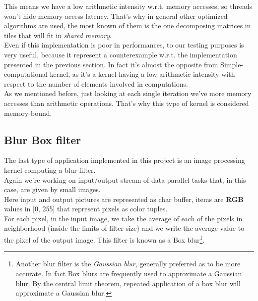 	This means we have a low arithmetic intensity w.r.t. memory accesses, so threads won't hide memory access latency.
	That's why in general other optimized algorithms are used, the most known of them is the one decomposing matrices in tiles that will fit in \textit{shared memory}.\\
	Even if this implementation is poor in performances, to our testing purposes is very useful, because it represent a counterexample w.r.t. the implementation presented in the previous section.
	In fact it's almost the opposite from Simple-computational kernel, as it's a kernel having a low arithmetic intensity with respect to the number of elements involved in computations.\\
	As we mentioned before, just looking at each single iteration we've more memory accesses than arithmetic operations.
	That's why this type of kernel is considered memory-bound.
	
	
\subsection{Blur Box filter}
	The last type of application implemented in this project is an image processing kernel computing a blur filter.\\
	Again we're working on input/output stream of data parallel tasks that, in this case, are given by small images.\\
	Here input and output pictures are represented as char buffer, items are \textbf{RGB} values in [0, 255] that represent pixels as color tuples.\\
	For each pixel, in the input image, we take the average of each of the pixels in neighborhood (inside the limits of filter size) and we write the average value to the pixel of the output image. This filter is known as a Box blur\footnote{Another blur filter is the \textit{Gaussian blur}, generally preferred as to be more accurate. In fact Box blurs are frequently used to approximate a Gaussian blur. By the central limit theorem, repeated application of a box blur will approximate a Gaussian blur.}.
	
